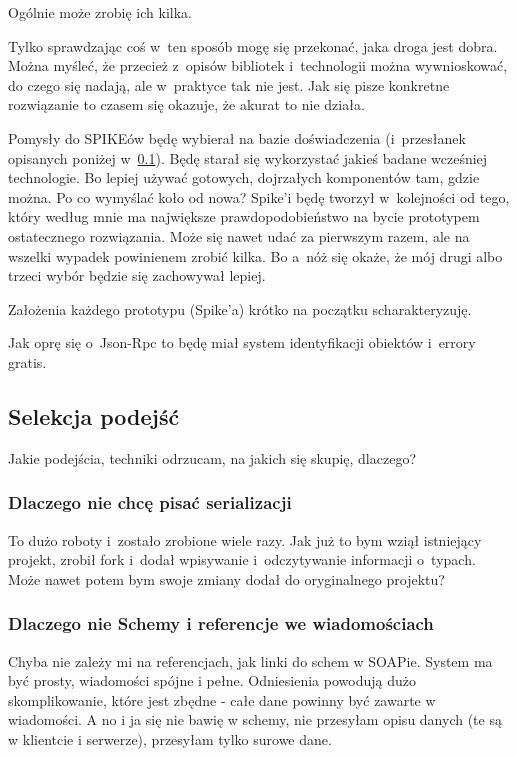 Ogólnie może zrobię ich kilka.

Tylko sprawdzając coś w~ten sposób mogę się przekonać, jaka droga jest dobra. Można myśleć, że przecież z~opisów bibliotek i~technologii można wywnioskować, do czego się nadają, ale w~praktyce tak nie jest. Jak się pisze konkretne rozwiązanie to czasem się okazuje, że akurat to nie działa.

Pomysły do SPIKEów będę wybierał na bazie doświadczenia (i~przesłanek opisanych poniżej w~\ref{approach-selection}).
Będę starał się wykorzystać jakieś badane wcześniej technologie. Bo lepiej używać gotowych, dojrzałych komponentów tam, gdzie można. Po co wymyślać koło od nowa?
Spike'i będę tworzył w~kolejności od tego, który według mnie ma największe prawdopodobieństwo na bycie prototypem ostatecznego rozwiązania.
Może się nawet udać za pierwszym razem, ale na wszelki wypadek powinienem zrobić kilka. Bo a~nóż się okaże, że mój drugi albo trzeci wybór będzie się zachowywał lepiej.

Założenia każdego prototypu (Spike'a) krótko na początku scharakteryzuję.

Jak oprę się o~Json-Rpc to będę miał system identyfikacji obiektów i~errory gratis.

\subsection{Selekcja podejść}
\label{approach-selection}
Jakie podejścia, techniki odrzucam, na jakich się skupię, dlaczego?

\subsubsection{Dlaczego nie chcę pisać serializacji}
To dużo roboty i~zostało zrobione wiele razy. Jak już to bym wziął istniejący projekt, zrobił fork i~dodał wpisywanie i~odczytywanie informacji o~typach. Może nawet potem bym swoje zmiany dodał do oryginalnego projektu?

\subsubsection{Dlaczego nie Schemy i referencje we wiadomościach}
Chyba nie zależy mi na referencjach, jak linki do schem w SOAPie. System ma być prosty, wiadomości spójne i pełne. Odniesienia powodują dużo skomplikowanie, które jest zbędne - całe dane powinny być zawarte w wiadomości. A no i ja się nie bawię w schemy, nie przesyłam opisu danych (te są w klientcie i serwerze), przesyłam tylko surowe dane.

